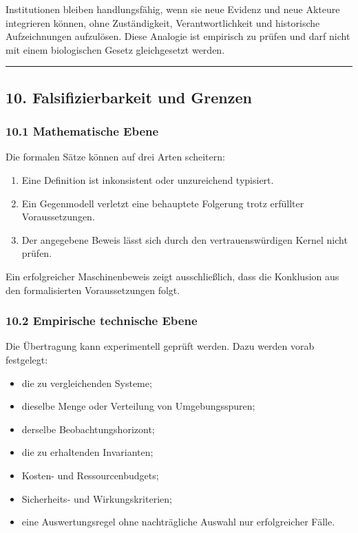 \documentclass[
  10pt,
  a4paper,
]{article}
\providecommand{\tightlist}{%
  \setlength{\itemsep}{0pt}\setlength{\parskip}{0pt}}
\begin{document}
Institutionen bleiben handlungsfähig, wenn sie neue Evidenz und neue
Akteure integrieren können, ohne Zuständigkeit, Verantwortlichkeit und
historische Aufzeichnungen aufzulösen. Diese Analogie ist empirisch zu
prüfen und darf nicht mit einem biologischen Gesetz gleichgesetzt
werden.

\begin{center}\rule{0.5\linewidth}{0.5pt}\end{center}

\hypertarget{falsifizierbarkeit-und-grenzen}{%
\subsection{10. Falsifizierbarkeit und
Grenzen}\label{falsifizierbarkeit-und-grenzen}}

\hypertarget{mathematische-ebene}{%
\subsubsection{10.1 Mathematische Ebene}\label{mathematische-ebene}}

Die formalen Sätze können auf drei Arten scheitern:

\begin{enumerate}
\def\labelenumi{\arabic{enumi}.}
\tightlist
\item
  Eine Definition ist inkonsistent oder unzureichend typisiert.
\item
  Ein Gegenmodell verletzt eine behauptete Folgerung trotz erfüllter
  Voraussetzungen.
\item
  Der angegebene Beweis lässt sich durch den vertrauenswürdigen Kernel
  nicht prüfen.
\end{enumerate}

Ein erfolgreicher Maschinenbeweis zeigt ausschließlich, dass die
Konklusion aus den formalisierten Voraussetzungen folgt.

\hypertarget{empirische-technische-ebene}{%
\subsubsection{10.2 Empirische technische
Ebene}\label{empirische-technische-ebene}}

Die Übertragung kann experimentell geprüft werden. Dazu werden vorab
festgelegt:

\begin{itemize}
\tightlist
\item
  die zu vergleichenden Systeme;
\item
  dieselbe Menge oder Verteilung von Umgebungsspuren;
\item
  derselbe Beobachtungshorizont;
\item
  die zu erhaltenden Invarianten;
\item
  Kosten- und Ressourcenbudgets;
\item
  Sicherheits- und Wirkungskriterien;
\item
  eine Auswertungsregel ohne nachträgliche Auswahl nur erfolgreicher
  Fälle.
\end{itemize}
\end{document}
